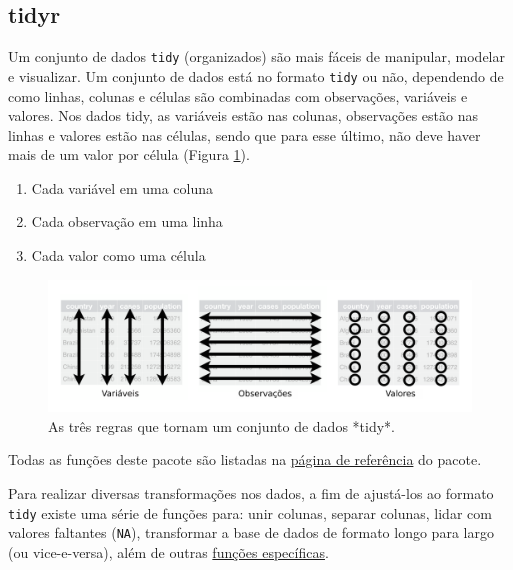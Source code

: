 \documentclass[
]{article}
\providecommand{\tightlist}{%
  \setlength{\itemsep}{0pt}\setlength{\parskip}{0pt}}
\begin{document}
\hypertarget{tidyr}{%
\subsection{tidyr}\label{tidyr}}

Um conjunto de dados \texttt{tidy} (organizados) são mais fáceis de manipular, modelar e visualizar. Um conjunto de dados está no formato \texttt{tidy} ou não, dependendo de como linhas, colunas e células são combinadas com observações, variáveis e valores. Nos dados tidy, as variáveis estão nas colunas, observações estão nas linhas e valores estão nas células, sendo que para esse último, não deve haver mais de um valor por célula (Figura \ref{fig:fig-r-dados-tidy}).

\begin{enumerate}
\def\labelenumi{\arabic{enumi}.}
\tightlist
\item
  Cada variável em uma coluna
\item
  Cada observação em uma linha
\item
  Cada valor como uma célula
\end{enumerate}

\begin{figure}

{\centering \includegraphics[width=0.75\linewidth,height=0.75\textheight]{figures/cap05_fig02} 

}

\caption{As três regras que tornam um conjunto de dados *tidy*.}\label{fig:fig-r-dados-tidy}
\end{figure}

Todas as funções deste pacote são listadas na \href{https://tidyr.tidyverse.org/reference/index.html}{página de referência} do pacote.

Para realizar diversas transformações nos dados, a fim de ajustá-los ao formato \texttt{tidy} existe uma série de funções para: unir colunas, separar colunas, lidar com valores faltantes (\texttt{NA}), transformar a base de dados de formato longo para largo (ou vice-e-versa), além de outras \href{https://tidyr.tidyverse.org/reference/index.html}{funções específicas}.
\end{document}

